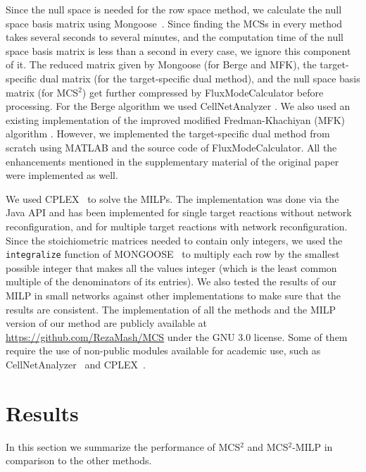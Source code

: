 \documentclass{bioinfo}
\theoremstyle{plain}
\theoremstyle{definition}
\begin{document}
Since the null space is needed for the row space method, we calculate the null space basis matrix using Mongoose~\cite{MONGOOSE}. Since finding the MCSs in every method takes several seconds to several minutes, and the computation time of the null space basis matrix is less than a second in every case, we ignore this component of it. The reduced matrix given by Mongoose (for Berge and MFK), the target-specific dual matrix (for the target-specific dual method), and the null space basis matrix (for MCS$^2$) get further compressed by FluxModeCalculator before processing. For the Berge algorithm we used CellNetAnalyzer \cite{Cellnet}. We also used an existing implementation of the improved modified Fredman-Khachiyan (MFK) algorithm \cite{Nafiseh}. However, we implemented the target-specific dual method from scratch using MATLAB and the source code of FluxModeCalculator. All the enhancements mentioned in the supplementary material of the original paper \cite{Duality} were implemented as well.

We used CPLEX~\cite{CPLEX} to solve the MILPs. The implementation was done via the Java API and has been implemented for single target reactions without network reconfiguration, and for multiple target reactions with network reconfiguration. Since the stoichiometric matrices needed to contain only integers, we used the \texttt{integralize} function of MONGOOSE~\cite{MONGOOSE} to multiply each row by the smallest possible integer that makes all the values integer (which is the least common multiple of the denominators of its entries). We also tested the results of our MILP in small networks against other implementations to make sure that the results are consistent. The implementation of all the methods and the MILP version of our method are publicly available at \url{https://github.com/RezaMash/MCS} under the GNU 3.0 license. Some of them require the use of non-public modules available for academic use, such as CellNetAnalyzer~\cite{Cellnet} and CPLEX~\cite{CPLEX}.

\enlargethispage{6pt}
\vspace{-0.5cm}
\section{Results}

In this section we summarize the performance of MCS$^2$ and MCS$^2$-MILP in comparison to the other methods.

\vspace{-0.5cm}
\end{document}
